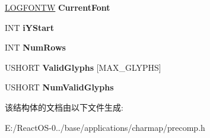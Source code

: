 \begin{DoxyCompactItemize}
\hyperlink{struct_l_o_g_f_o_n_t_w}{L\+O\+G\+F\+O\+N\+TW} {\bfseries Current\+Font}
\item 
\mbox{\label{struct___m_a_p_a245d121b418a7ad311405c8bc2fe3189}} 
I\+NT {\bfseries i\+Y\+Start}
\item 
\mbox{\label{struct___m_a_p_a26069822d81a851f0dbc07e81d8a7318}} 
I\+NT {\bfseries Num\+Rows}
\item 
\mbox{\label{struct___m_a_p_a3b4b128036fdde39b992b22fb8b36158}} 
U\+S\+H\+O\+RT {\bfseries Valid\+Glyphs} \mbox{[}M\+A\+X\+\_\+\+G\+L\+Y\+P\+HS\mbox{]}
\item 
\mbox{\label{struct___m_a_p_af6e732feaf85c82891fa2170c3ea8c17}} 
U\+S\+H\+O\+RT {\bfseries Num\+Valid\+Glyphs}
\end{DoxyCompactItemize}


该结构体的文档由以下文件生成\+:\begin{DoxyCompactItemize}
\item 
E\+:/\+React\+O\+S-\/0../base/applications/charmap/precomp.\+h\end{DoxyCompactItemize}

